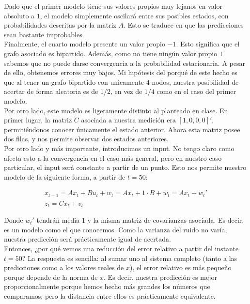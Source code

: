 \documentclass[a4paper]{article}
\begin{document}
Dado que el primer modelo tiene sus valores propios muy lejanos en valor absoluto a $1$, el modelo simplemente oscilará entre sus posibles estados, con probabilidades descritas por la matriz $A$. Esto se traduce en que las predicciones sean bastante improbables.\\

Finalmente, el cuarto modelo presente un valor propio $-1$. Esto significa que el grafo asociado es bipartido. Además, como no tiene ningún valor propio $1$ sabemos que no puede darse convergencia a la probabilidad estacionaria. A pesar de ello, obtenemos errores muy bajos. Mi hipótesis del porqué de este hecho es que al tener un grafo bipartido con unicamente $4$ nodos, nuestra posibilidad de acertar de forma aleatoria es de $1/2$, en vez de $1/4$ como en el caso del primer modelo. \\

Por otro lado, este modelo es ligeramente distinto al planteado en clase. En primer lugar, la matriz $C$ asociada a nuestra medición era $[1,0,0,0]'$, permitiéndonos conocer únicamente el estado anterior. Ahora esta matriz posee dos filas, y nos permite observar dos estados anteriores. \\

Por otro lado y más importante, introducimos un input. No tengo claro como afecta esto a la convergencia en el caso más general, pero en nuestro caso particular, el input será constante a partir de un punto. Esto nos permite nuestro modelo de la siguiente forma, a partir de $t=50$:

\begin{gather*}
	x_{t+1} = A x_t + B u_t + w_t = A x_t + 1 \cdot B + w_t = A x_t + w_t' \\
	z_t = C x_t + v_t
\end{gather*}

Donde $w_t'$ tendrán media $1$ y la misma matriz de covarianzas asociada. Es decir, es un modelo como el que conocemos. Como la varianza del ruido no varía, nuestra predicción será prácticamente igual de acertada. \\

Entonces, ¿por qué vemos una reducción del error relativo a partir del instante $t=50$? La respuesta es sencilla: al sumar uno al sistema completo (tanto a las predicciones como a los valores reales de $x$), el error relativo es más pequeño porque depende de la norma de $x$. Es decir, nuestra predicción es mejor proporcionalmente porque hemos hecho más grandes los números que comparamos, pero la distancia entre ellos es prácticamente equivalente.
\end{document}
